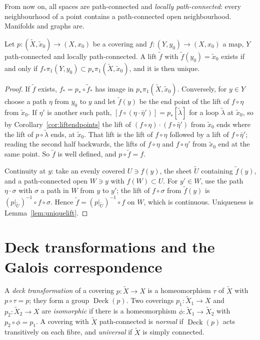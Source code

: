 From now on, all spaces are path-connected and \emph{locally path-connected}: every neighbourhood of a point contains a path-connected open neighbourhood. Manifolds and graphs are.

\begin{theorem}\label{thm:liftcrit}
Let $p\colon(\tilde X,\tilde x_0)\to(X,x_0)$ be a covering and $f\colon(Y,y_0)\to(X,x_0)$ a map, $Y$ path-connected and locally path-connected. A lift $\tilde f$ with $\tilde f(y_0)=\tilde x_0$ exists if and only
if $f_*\pi_1(Y,y_0)\subset p_*\pi_1(\tilde X,\tilde x_0)$, and it is then unique.
\end{theorem}

\begin{proof}
If $\tilde f$ exists, $f_*=p_*\circ\tilde f_*$ has image in $p_*\pi_1(\tilde X,\tilde x_0)$. Conversely, for $y\in Y$ choose a path $\eta$ from $y_0$ to $y$ and let $\tilde f(y)$ be the end point of the lift of
$f\circ\eta$ from $\tilde x_0$. If $\eta'$ is another such path, $[f\circ(\eta\cdot\bar\eta')]=p_*[\tilde\lambda]$ for a loop $\tilde\lambda$ at $\tilde x_0$, so by Corollary~\ref{cor:liftendpoints} the lift of
$(f\circ\eta)\cdot(f\circ\bar\eta')$ from $\tilde x_0$ ends where the lift of $p\circ\tilde\lambda$ ends, at $\tilde x_0$. That lift is the lift of $f\circ\eta$ followed by a lift of $f\circ\bar\eta'$; reading the second half backwards,
the lifts of $f\circ\eta$ and $f\circ\eta'$ from $\tilde x_0$ end at the same point. So $\tilde f$ is well defined, and $p\circ\tilde f=f$.

Continuity at $y$: take an evenly covered $U\ni f(y)$, the sheet $\tilde U$ containing $\tilde f(y)$, and a path-connected open $W\ni y$ with $f(W)\subset U$. For $y'\in W$, use the path $\eta\cdot\sigma$
with $\sigma$ a path in $W$ from $y$ to $y'$; the lift of $f\circ\sigma$ from $\tilde f(y)$ is $(p|_{\tilde U})^{-1}\circ f\circ\sigma$. Hence $\tilde f=(p|_{\tilde U})^{-1}\circ f$ on $W$, which is continuous. Uniqueness is
Lemma~\ref{lem:uniquelift}.
\end{proof}

\section{Deck transformations and the Galois correspondence}

\begin{definition}
A \emph{deck transformation} of a covering $p\colon\tilde X\to X$ is a homeomorphism $\tau$ of $\tilde X$ with $p\circ\tau=p$; they form a group $\operatorname{Deck}(p)$. Two coverings $p_1\colon\tilde X_1\to X$ and
$p_2\colon\tilde X_2\to X$ are \emph{isomorphic} if there is a homeomorphism $\phi\colon\tilde X_1\to\tilde X_2$ with $p_2\circ\phi=p_1$. A covering with $\tilde X$ path-connected is \emph{normal} if
$\operatorname{Deck}(p)$ acts transitively on each fibre, and \emph{universal} if $\tilde X$ is simply connected.
\end{definition}

